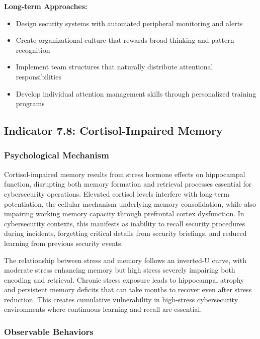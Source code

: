 \documentclass[11pt,a4paper]{article}
\begin{document}
\textbf{Long-term Approaches:}
\begin{itemize}
\item Design security systems with automated peripheral monitoring and alerts
\item Create organizational culture that rewards broad thinking and pattern recognition
\item Implement team structures that naturally distribute attentional responsibilities
\item Develop individual attention management skills through personalized training programs
\end{itemize}

\subsection{Indicator 7.8: Cortisol-Impaired Memory}

\subsubsection{Psychological Mechanism}

Cortisol-impaired memory results from stress hormone effects on hippocampal function, disrupting both memory formation and retrieval processes essential for cybersecurity operations\cite{lupien2007}. Elevated cortisol levels interfere with long-term potentiation, the cellular mechanism underlying memory consolidation, while also impairing working memory capacity through prefrontal cortex dysfunction\cite{mcewen2012}. In cybersecurity contexts, this manifests as inability to recall security procedures during incidents, forgetting critical details from security briefings, and reduced learning from previous security events\cite{memory2023}.

The relationship between stress and memory follows an inverted-U curve, with moderate stress enhancing memory but high stress severely impairing both encoding and retrieval\cite{yerkes1908}. Chronic stress exposure leads to hippocampal atrophy and persistent memory deficits that can take months to recover even after stress reduction\cite{chronic2022}. This creates cumulative vulnerability in high-stress cybersecurity environments where continuous learning and recall are essential\cite{cumulative2023}.

\subsubsection{Observable Behaviors}
\end{document}
